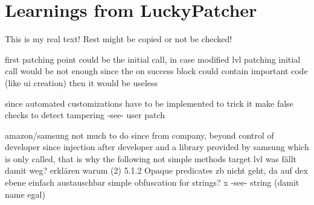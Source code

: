\section{Learnings from LuckyPatcher}\label{section:luckypatcher-learnings}
This is my real text! Rest might be copied or not be checked!

%
first patching point could be the initial call, in case modified lvl patching initial call would be not enough since the on success block could contain important code (like ui creation) then it would be useless

since automated customizations have to be implemented to trick it
make false checks to detect tampering -see- user patch

amazon/samsung not much to do since from company, beyond control of developer since injection after developer and a library provided by samsung which is only called, that is why the following not simple methods target lvl
\cite{munteanLicense}
%
was fällt damit weg?\newline
erklären warum 	(2) 5.1.2 Opaque predicates zb nicht geht, da auf dex ebene einfach austauschbar\newline
simple obfuscation for strings? x -see- string (damit name egal)
